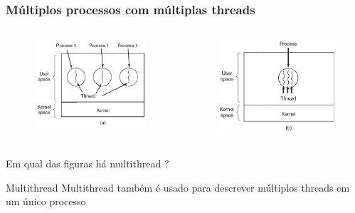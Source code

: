 \documentclass[11pt]{beamer}
\begin{document}
\begin{frame}\frametitle{ Múltiplos processos com múltiplas threads}

\begin{columns}

\begin{column}{0.01cm}
\begin{figure}[ht]
\begin{center}
\includegraphics[height=3.3cm]{Figuras/process-thread1.png}
\end{center}

\end{figure}
\end{column}

\pause

\begin{column}{0.01cm}
\begin{figure}[ht]
\begin{center}
\includegraphics[height=3.5cm]{Figuras/process-thread3.png}
\end{center}
\end{figure}
\end{column}

\end{columns}
Em qual das figuras há multithread ?

\pause

\begin{block}{Multithread}
 Multithread também é usado para descrever múltiplos threads em um único processo
\end{block}

\end{frame}


\end{document}
